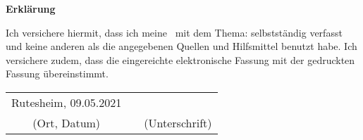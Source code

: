 \clearpage

\thispagestyle{empty}

{\LARGE\textsf{\textbf{Erklärung}}\bigskip}

Ich versichere hiermit, dass ich meine \typMeinerArbeit\ mit dem Thema: \emph{\themaMeinerArbeit} selbstständig verfasst und keine anderen als die angegebenen Quellen und Hilfsmittel benutzt habe.
Ich versichere zudem, dass die eingereichte elektronische Fassung mit der gedruckten Fassung übereinstimmt.

\vspace{3cm}

\begin{center}
\begin{tabular}{ccc}
Rutesheim, 09.05.2021 &  & \\
(Ort, Datum) & \hspace{0.3\linewidth} & (Unterschrift)
\end{tabular}
\end{center}